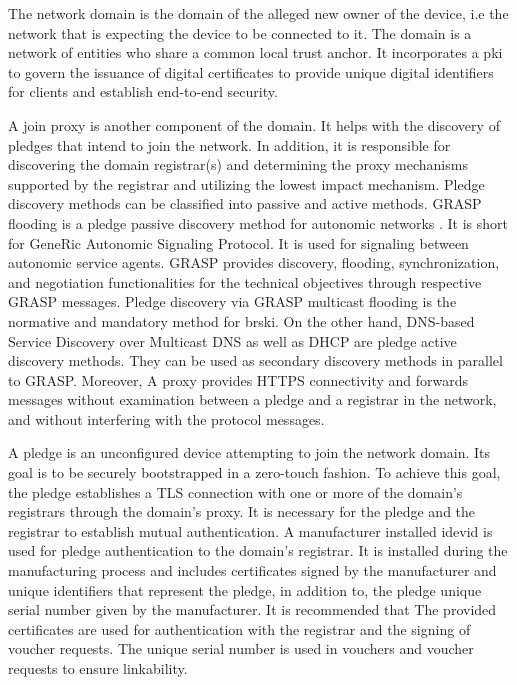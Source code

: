 The network domain is the domain of the alleged new owner of the device, i.e the network that is expecting the device to be connected to it. The domain is a network of entities who share a common local trust anchor. 
It incorporates a \gls{pki} to govern the issuance of digital certificates to provide unique digital identifiers for clients and establish end-to-end security. 
\par
A join proxy is another component of the domain. It helps with the discovery of pledges that intend to join the network. In addition, it is responsible for discovering the domain registrar(s) and determining the proxy mechanisms supported by the registrar and utilizing the lowest impact mechanism.
Pledge discovery methods can be classified into passive and active methods. 
GRASP flooding \cite{rfc8990} is a pledge passive discovery method for autonomic networks \cite{kephart2003vision}. It is short for GeneRic Autonomic Signaling Protocol. It is used for signaling between autonomic service agents. GRASP provides discovery, flooding, synchronization, and negotiation functionalities for the technical objectives through respective GRASP messages. Pledge discovery via GRASP multicast flooding is the normative and mandatory method for \gls{brski}.
On the other hand, DNS-based Service Discovery \cite{rfc6763} over Multicast DNS \cite{rfc6762} as well as DHCP \cite{rfc2131} are pledge active discovery methods. They can be used as secondary discovery methods in parallel to GRASP.
Moreover, A proxy provides HTTPS connectivity and forwards messages without examination between a pledge and a registrar in the network, and without interfering with the protocol messages.
\par
A pledge is an unconfigured device attempting to join the network domain. Its goal is to be securely bootstrapped in a zero-touch fashion. To achieve this goal, the pledge establishes a TLS connection with one or more of the domain's registrars through the domain's proxy. It is necessary for the pledge and the registrar to establish mutual authentication. A manufacturer installed \gls{idevid} is used for pledge authentication to the domain's registrar. It is installed during the manufacturing process and includes certificates signed by the manufacturer and unique identifiers that represent the pledge, in addition to, the pledge unique serial number given by the manufacturer. It is recommended that The provided certificates are used for authentication with the registrar and the signing of voucher requests. The unique serial number is used in vouchers and voucher requests to ensure linkability. 
